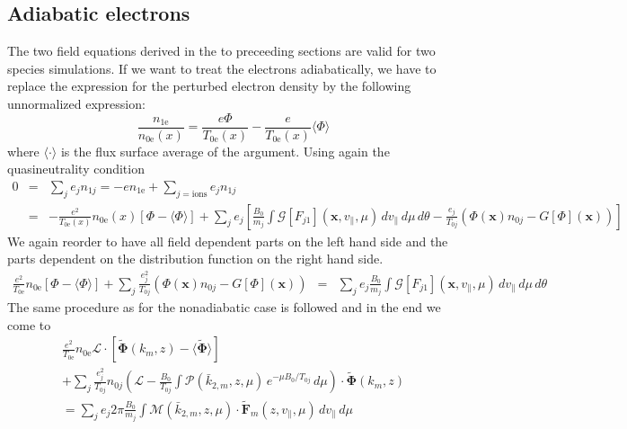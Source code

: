 \subsection{Adiabatic electrons}
\label{sec:adiabatic_electrons}
The two field equations derived in the to preceeding sections are
valid for two species simulations. If we want to treat the electrons
adiabatically, we have to replace the expression for the perturbed
electron density by the following unnormalized expression:
\begin{displaymath}
  \frac{n_{1\mathrm{e}}}{n_{0\mathrm{e}}(x)} 
  = \frac{e\Phi}{T_{0\mathrm{e}}(x)}-\frac{e}{T_{0\mathrm{e}}(x)}\langle\Phi\rangle
\end{displaymath}
where $\langle\cdot\rangle$ is the flux surface average of the argument.
Using again the quasineutrality condition
\begin{eqnarray*}
  0&=&\sum_j e_jn_{1j}
  =-en_{1\mathrm{e}}+\sum_{j=\mbox{ions}}e_jn_{1j}\\
  &=&-\frac{e^2}{T_{0\mathrm{e}}(x)}n_{0\mathrm{e}}(x)\left[
    \Phi
    -\langle\Phi\rangle
  \right]
  +\sum_{j}e_j\left[
    \frac{B_0}{m_j}\int \mathcal{G}[F_{j1}](\mathbf{x},v_\|,\mu)\,dv_\|\,d\mu\,d\theta
    -\frac{e_j}{T_{0j}}\left(
      \Phi(\mathbf{x}) n_{0j}
      -G[\Phi](\mathbf{x})
    \right) 
  \right]
\end{eqnarray*}
We again reorder to have all field dependent parts on the left hand
side and the parts dependent on the distribution function on the right
hand side.
\begin{eqnarray*}
  \frac{e^2}{T_{0\mathrm{e}}}n_{0\mathrm{e}}\left[
    \Phi
    -\langle\Phi\rangle
  \right] 
  +\sum_{j}\frac{e_j^2}{T_{0j}}\left(
    \Phi(\mathbf{x}) n_{0j}
    -G[\Phi](\mathbf{x})
  \right) 
  &=& \sum_{j}e_j\frac{B_0}{m_j}\int \mathcal{G}[F_{j1}](\mathbf{x},v_\|,\mu)\,dv_\|\,d\mu\,d\theta
\end{eqnarray*}
The same procedure as for the nonadiabatic case is followed and in the
end we come to
\begin{multline*}
  \frac{e^2}{T_{0\mathrm{e}}}n_{0\mathrm{e}}\mathcal{L}\cdot\left[
    \tilde{\mathbf{\Phi}}(k_m,z)
    -\tilde{\mathbf{\langle\Phi\rangle}}
  \right] \\
  +\sum_{j}\frac{e_j^2}{T_{0j}}n_{0j}\left(
    \mathcal{L} 
    -\frac{B_0}{T_{0j}}\int \mathcal{P}(\bar{k}_{2,m},z,\mu)
    \,e^{-\mu B_0/T_{0j}}\,d\mu
  \right)\cdot\tilde{\mathbf{\Phi}}(k_m,z) \\
  = \sum_j e_j 2\pi\frac{B_0}{m_j}\int 
  \mathcal{M}(\bar{k}_{2,m},z,\mu)\cdot\tilde{\mathbf{F}}_m(z,v_\|,\mu)\,dv_\|\,d\mu
\end{multline*}
